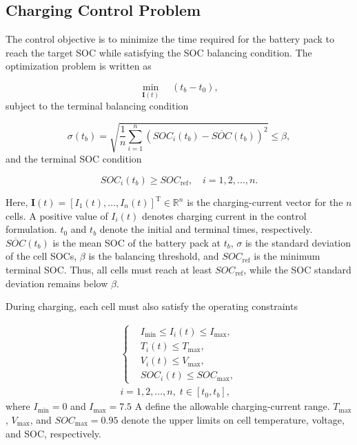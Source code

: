 \documentclass[10pt,journal,letterpaper]{IEEEtran}
\begin{document}
\subsection{Charging Control Problem}

The control objective is to minimize the time required for the battery pack to reach the target SOC while satisfying the SOC balancing condition. The optimization problem is written as

\begin{equation}\label{eq:balancing_objective}
    \min_{\mathbf{I}(t)} \quad \left(t_b-t_0\right),
\end{equation}
subject to the terminal balancing condition

\begin{equation}\label{eq:terminal_balance}
    \sigma(t_b)
    =
    \sqrt{
        \frac{1}{n}
        \sum_{i=1}^{n}
        \left(
            SOC_i(t_b)-\overline{SOC}(t_b)
        \right)^2
    }
    \leq \beta,
\end{equation}
and the terminal SOC condition

\begin{equation}\label{eq:terminal_soc}
    SOC_i(t_b)\geq SOC_{\mathrm{ref}},
    \quad i=1,2,\ldots,n.
\end{equation}

Here,
$   \mathbf{I}(t)
    =
    \left[
    I_1(t),\ldots,I_n(t)
    \right]^{\mathrm{T}}
    \in \mathbb{R}^{n}$
is the charging-current vector for the $n$ cells. A positive value of $I_i(t)$ denotes charging current in the control formulation.
$t_0$ and $t_b$ denote the initial and terminal times, respectively.
$\overline{SOC}(t_b)$ is the mean SOC of the battery pack at $t_b$, $\sigma$ is the standard deviation of the cell SOCs, $\beta$ is the balancing threshold, and $SOC_{\mathrm{ref}}$ is the minimum terminal SOC. Thus, all cells must reach at least $SOC_{\mathrm{ref}}$, while the SOC standard deviation remains below $\beta$.

During charging, each cell must also satisfy the operating constraints

\begin{equation}\label{eq:safety_constraints}
    \begin{gathered}
    \left\{
    \begin{aligned}
    &I_{\min} \leq I_i(t) \leq I_{\max},\\
    &T_i(t) \leq T_{\max},\\ 
    &V_i(t) \leq V_{\max},\\
    &SOC_i(t) \leq SOC_{\max},
    \end{aligned}
    \right.\\[4pt]
    i=1,2,\ldots,n,\;
    t\in[t_0,t_b],
    \end{gathered}
\end{equation}
where $I_{\min}=0$ and $I_{\max}=7.5$ A define the allowable charging-current range.
$T_{\max}$, $V_{\max}$, and $SOC_{\max}=0.95$ denote the upper limits on cell temperature, voltage, and SOC, respectively.
\end{document}
